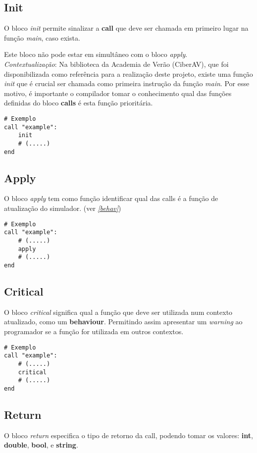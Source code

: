 \documentclass{report}
\begin{document}
\subsection{Init}
O bloco \textit{init} permite sinalizar a \textbf{call} que deve ser chamada em primeiro lugar na função \textit{main}, caso exista.

Este bloco não pode estar em simultâneo com o bloco \textit{apply}.\\

\textit{Contextualização}: Na biblioteca da Academia de Verão (CiberAV), que foi disponibilizada como referência para a realização deste projeto, existe uma função \textit{init} que é crucial ser chamada como primeira instrução da função \textit{main}. Por esse motivo, é importante o compilador tomar o conhecimento qual das funções definidas do bloco \textbf{calls} é esta função prioritária.

\begin{verbatim}
# Exemplo
call "example":
    init
    # (.....)
end
\end{verbatim}

\subsection{Apply}
O bloco \textit{apply} tem como função identificar qual das calls é a função de atualização do simulador. (ver \textit{\autoref{behav}})

\begin{verbatim}
# Exemplo
call "example":
    # (.....)
    apply
    # (.....)
end
\end{verbatim}

\subsection{Critical}
O bloco \textit{critical} significa qual a função que deve ser utilizada num contexto atualizado, como um \textbf{behaviour}. Permitindo assim apresentar um \textit{warning} ao programador se a função for utilizada em outros contextos.

\begin{verbatim}
# Exemplo
call "example":
    # (.....)
    critical
    # (.....)
end
\end{verbatim}

\subsection{Return}
O bloco \textit{return} especifica o tipo de retorno da call, podendo tomar os valores: \textbf{int}, \textbf{double}, \textbf{bool}, e \textbf{string}.
\end{document}
